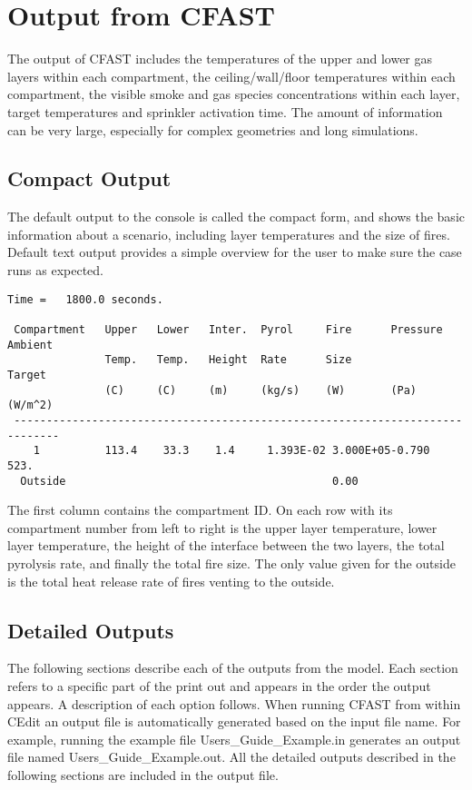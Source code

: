 \chapter{Output from CFAST}
\label{Output_Chapter}

The output of CFAST includes the temperatures of the upper and lower gas layers within each compartment, the ceiling/wall/floor temperatures within each compartment, the visible smoke and gas species concentrations within each layer, target temperatures and sprinkler activation time.  The amount of information can be very large, especially for complex geometries and long simulations.

\section{Compact Output}

The default output to the console is called the compact form, and shows the basic information about a scenario, including layer temperatures and the size of fires. Default text output provides a simple overview for the user to make sure the case runs as expected.
\begin{lstlisting}[basicstyle=\scriptsize]
 Time =   1800.0 seconds.

 Compartment   Upper   Lower   Inter.  Pyrol     Fire      Pressure  Ambient
               Temp.   Temp.   Height  Rate      Size                Target
               (C)     (C)     (m)     (kg/s)    (W)       (Pa)      (W/m^2)
 -----------------------------------------------------------------------------
    1          113.4    33.3    1.4     1.393E-02 3.000E+05-0.790      523.
  Outside                                         0.00
\end{lstlisting}
The first column contains the compartment ID.  On each row with its compartment number from left to right is the upper layer temperature, lower layer temperature, the height of the interface between the two layers, the total pyrolysis rate, and finally the total fire size.  The only value given for the outside is the total heat release rate of fires venting to the outside.

\section{Detailed Outputs}

The following sections describe each of the outputs from the model.  Each section refers to a specific part of the print out and appears in the order the output appears. A description of each option follows. When running CFAST from within CEdit an output file is automatically generated based on the input file name. For example, running the example file  {\ct Users\_Guide\_Example.in} generates an output file named  {\ct Users\_Guide\_Example.out}. All the detailed outputs described in the following sections are included in the output file.


